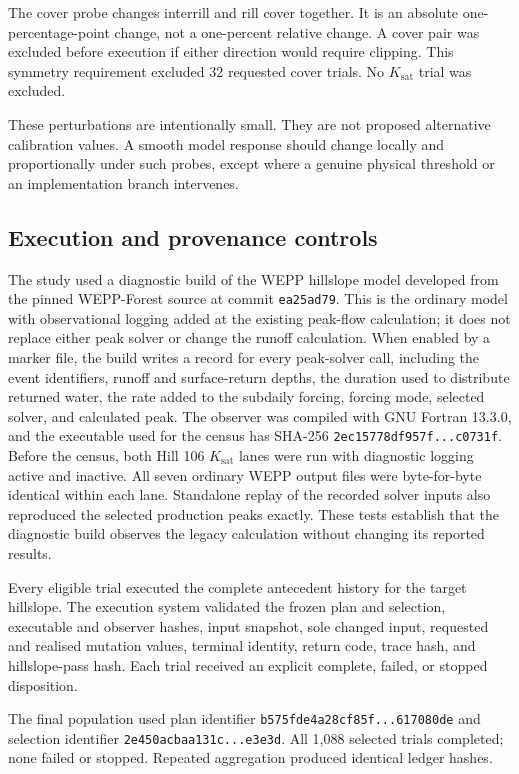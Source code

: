 \documentclass[11pt]{article}
\newcommand{\Ksat}{\ensuremath{K_{\mathrm{sat}}}}
\begin{document}
The cover probe changes interrill and rill cover together. It is an absolute
one-percentage-point change, not a one-percent relative change. A cover pair was
excluded before execution if either direction would require clipping. This
symmetry requirement excluded 32 requested cover trials. No \Ksat{} trial was
excluded.

These perturbations are intentionally small. They are not proposed alternative
calibration values. A smooth model response should change locally and
proportionally under such probes, except where a genuine physical threshold or
an implementation branch intervenes.

\subsection{Execution and provenance controls}

The study used a diagnostic build of the WEPP hillslope model developed from
the pinned WEPP-Forest source at commit \texttt{ea25ad79}. This is the ordinary
model with observational logging added at the existing peak-flow calculation;
it does not replace either peak solver or change the runoff calculation. When
enabled by a marker file, the build writes a record for every peak-solver call,
including the event identifiers, runoff and surface-return depths, the duration
used to distribute returned water, the rate added to the subdaily forcing,
forcing mode, selected solver, and calculated peak. The observer was compiled
with GNU Fortran 13.3.0, and the executable used for the census has SHA-256
\texttt{2ec15778df957f...c0731f}. Before the census, both Hill 106 \Ksat{}
lanes were run with diagnostic logging active and inactive. All seven ordinary
WEPP output files were byte-for-byte identical within each lane. Standalone
replay of the recorded solver inputs also reproduced the selected production
peaks exactly. These tests establish that the diagnostic build observes the
legacy calculation without changing its reported results.

Every eligible trial executed the complete antecedent history for the target
hillslope. The execution system validated the frozen plan and selection,
executable and observer hashes, input snapshot, sole changed input, requested
and realised mutation values, terminal identity, return code, trace hash, and
hillslope-pass hash. Each trial received an explicit complete, failed, or
stopped disposition.

The final population used plan identifier
\texttt{b575fde4a28cf85f...617080de} and selection identifier
\texttt{2e450acbaa131c...e3e3d}. All 1,088 selected trials completed; none
failed or stopped. Repeated aggregation produced identical ledger hashes.
\end{document}
